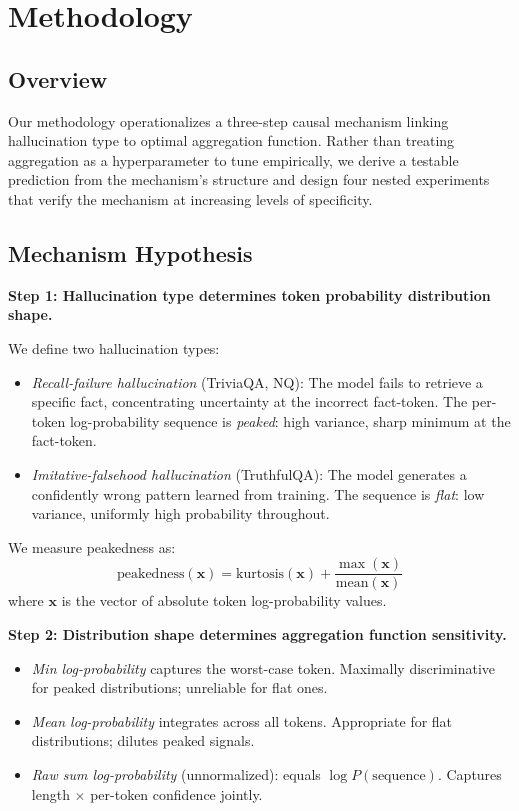 \section{Methodology}

\subsection{Overview}

Our methodology operationalizes a three-step causal mechanism linking hallucination type to optimal aggregation function. Rather than treating aggregation as a hyperparameter to tune empirically, we derive a testable prediction from the mechanism's structure and design four nested experiments that verify the mechanism at increasing levels of specificity.

\subsection{Mechanism Hypothesis}

\textbf{Step 1: Hallucination type determines token probability distribution shape.}

We define two hallucination types:

\begin{itemize}
\item \emph{Recall-failure hallucination} (TriviaQA, NQ): The model fails to retrieve a specific fact, concentrating uncertainty at the incorrect fact-token. The per-token log-probability sequence is \emph{peaked}: high variance, sharp minimum at the fact-token.
\item \emph{Imitative-falsehood hallucination} (TruthfulQA): The model generates a confidently wrong pattern learned from training. The sequence is \emph{flat}: low variance, uniformly high probability throughout.
\end{itemize}

We measure peakedness as:
\[
\text{peakedness}(\mathbf{x}) = \text{kurtosis}(\mathbf{x}) + \frac{\max(\mathbf{x})}{\text{mean}(\mathbf{x})}
\]
where $\mathbf{x}$ is the vector of absolute token log-probability values.

\textbf{Step 2: Distribution shape determines aggregation function sensitivity.}

\begin{itemize}
\item \emph{Min log-probability} captures the worst-case token. Maximally discriminative for peaked distributions; unreliable for flat ones.
\item \emph{Mean log-probability} integrates across all tokens. Appropriate for flat distributions; dilutes peaked signals.
\item \emph{Raw sum log-probability} (unnormalized): equals $\log P(\text{sequence})$. Captures length $\times$ per-token confidence jointly.
\end{itemize}

